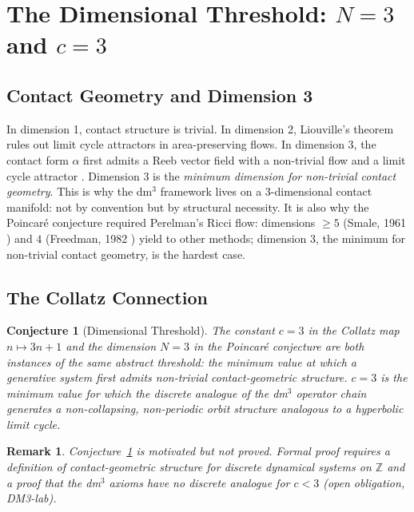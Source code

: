 \documentclass[12pt,a4paper]{article}
\newtheorem{conjecture}[theorem]{Conjecture}
\newtheorem{remark}{Remark}[section]
\begin{document}
\section{The Dimensional Threshold: $N = 3$ and $c = 3$}
\label{sec:threshold}

\subsection{Contact Geometry and Dimension 3}

In dimension 1, contact structure is trivial.
In dimension 2, Liouville's theorem rules out limit cycle attractors
in area-preserving flows.
In dimension 3, the contact form $\alpha$ first admits a Reeb vector
field with a non-trivial flow and a limit cycle attractor
\cite{Geiges2008}.
Dimension 3 is the \emph{minimum dimension for non-trivial contact
geometry}.
This is why the dm$^3$ framework lives on a 3-dimensional contact
manifold: not by convention but by structural necessity.
It is also why the Poincar\'e conjecture required Perelman's
Ricci flow: dimensions $\geq 5$ (Smale, 1961 \cite{Smale1961})
and $4$ (Freedman, 1982 \cite{Freedman1982}) yield to other methods;
dimension 3, the minimum for non-trivial contact geometry, is the
hardest case.

\subsection{The Collatz Connection}

\begin{conjecture}[Dimensional Threshold]
\label{conj:threshold}
The constant $c = 3$ in the Collatz map $n \mapsto 3n+1$ and the
dimension $N = 3$ in the Poincar\'e conjecture are both instances of
the same abstract threshold: the minimum value at which a generative
system first admits non-trivial contact-geometric structure.
$c = 3$ is the minimum value for which the discrete analogue of the
dm$^3$ operator chain generates a non-collapsing, non-periodic orbit
structure analogous to a hyperbolic limit cycle.
\end{conjecture}

\begin{remark}
Conjecture~\ref{conj:threshold} is motivated but not proved.
Formal proof requires a definition of contact-geometric structure for
discrete dynamical systems on $\mathbb{Z}$ and a proof that the
dm$^3$ axioms have no discrete analogue for $c < 3$ (open obligation,
DM3-lab).
\end{remark}
\end{document}
